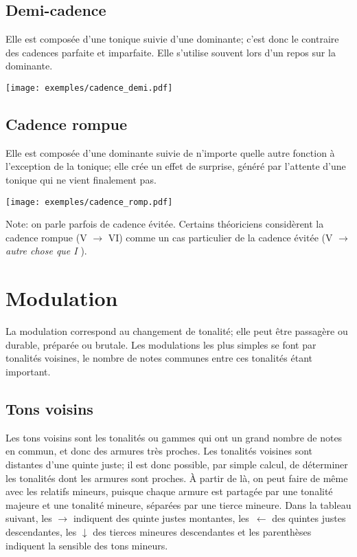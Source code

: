 \documentclass[11pt,a4paper]{scrreprt}
\begin{document}
\subsection{Demi-cadence}
Elle est composée d'une tonique suivie d'une dominante; c'est donc le contraire des cadences parfaite et imparfaite. Elle s'utilise souvent lors d'un repos sur la dominante.
\begin{center}
   \texttt{[image: exemples/cadence\_demi.pdf]}
\end{center}
\subsection{Cadence rompue}
Elle est composée d'une dominante suivie de n'importe quelle autre fonction à l'exception de la tonique; elle crée un effet de surprise, généré par l'attente d'une tonique qui ne vient finalement pas.
\begin{center}
   \texttt{[image: exemples/cadence\_romp.pdf]}
\end{center}

Note: on parle parfois de cadence évitée. Certains théoriciens considèrent la cadence rompue (V $\to$ VI) comme un cas particulier de la cadence évitée (V $\to$ \emph{autre chose que I} ).
\section{Modulation}
La modulation correspond au changement de tonalité; elle peut être passagère ou durable, préparée ou brutale. Les modulations les plus simples se font par tonalités voisines, le nombre de notes communes entre ces tonalités étant important.
\subsection{Tons voisins}
Les tons voisins sont les tonalités ou gammes qui ont un grand nombre de notes en commun, et donc des armures très proches. Les tonalités voisines sont distantes d'une quinte juste; il est donc possible, par simple calcul, de déterminer les tonalités dont les armures sont proches. À partir de là, on peut faire de même avec les relatifs mineurs, puisque chaque armure est partagée par une tonalité majeure et une tonalité mineure, séparées par une tierce mineure. Dans la tableau suivant, les $\to$ indiquent des quinte justes montantes, les~$\leftarrow$ des quintes justes descendantes, les $\downarrow$ des tierces mineures descendantes et les parenthèses indiquent la sensible des tons mineurs.
\end{document}
